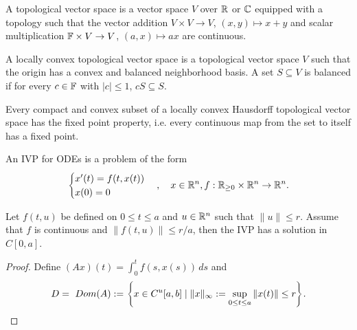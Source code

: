 \begin{df}
    A topological vector space is a vector space $V$ over ${\mathbb R}$ or ${\mathbb C}$ equipped with a topology such that the vector addition $V \times V \to V$, $(x, y) \mapsto x + y$ and scalar multiplication ${\mathbb F} \times V \to V$, $(a, x) \mapsto ax$ are continuous.
\end{df}

\begin{df}
    A locally convex topological vector space is a topological vector space $V$ such that the origin has a convex and balanced neighborhood basis. A set $S \subseteq V$ is balanced if for every $c \in {\mathbb F}$ with $|c| \leq 1$, $cS \subseteq S$.
\end{df}

\begin{thm}
    Every compact and convex subset of a locally convex Hausdorff topological vector space has the fixed point property, i.e. every continuous map from the set to itself has a fixed point.
\end{thm}

An IVP for ODEs is a problem of the form
\[
\begin{cases}
    x'(t) = f(t, x(t)) \\
    x(0) = 0
\end{cases}, \quad x \in {\mathbb R}^n, f: {\mathbb R}_{\geq 0} \times {\mathbb R}^n \to {\mathbb R}^n.
\]

\begin{thm}
    Let $f(t, u)$ be defined on $0 \leq t \leq a$ and $u \in {\mathbb R}^n$ such that $\|u\| \leq r$. Assume that $f$ is continuous and $\|f(t, u)\| \leq r/a$, then the IVP has a solution in $C[0, a]$.
    \begin{proof}
        Define $(Ax)(t) = \int_0^t f(s, x(s)) \, ds$ and
        \[
        D = ~Dom (A) := {\left\{{x \in C^u[a, b] \mid \|x\|_\infty := \sup_{0 \leq t \leq a} \|x(t)\| \leq r}\right\}}.
        \]
    \end{proof}
\end{thm}